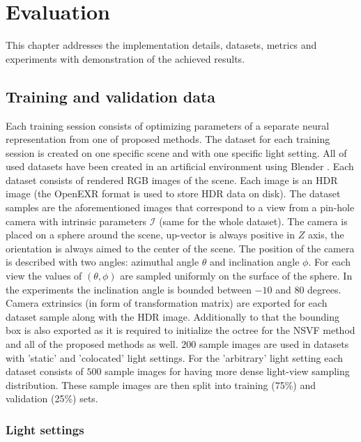 
\chapter{Evaluation}
\label{chap:evaluation}

This chapter addresses the implementation details,
datasets, metrics and experiments with demonstration of the achieved results.



\section{Training and validation data}
\label{sec:datasets}

Each training session consists of optimizing parameters of a separate neural representation from one of proposed methods.
The dataset for each training session is created on one specific scene and with one specific light setting.
All of used datasets have been created in an artificial environment using Blender \cite{blender}.
Each dataset consists of rendered RGB images of the scene.
Each image is an HDR image (the OpenEXR \cite{openexr} format is used to store HDR data on disk).
The dataset samples are the aforementioned images
that correspond to a view from a pin-hole camera with intrinsic parameters $\mathcal{I}$ (same for the whole dataset).
The camera is placed on a sphere around the scene,
up-vector is always positive in $Z$ axis,
the orientation is always aimed to the center of the scene.
The position of the camera is described with two angles: azimuthal angle $\theta$ and inclination angle $\phi$.
For each view the values of $(\theta, \phi)$ are sampled uniformly on the surface of the sphere.
In the experiments the inclination angle is bounded between $-10$ and $80$ degrees.
Camera extrinsics (in form of transformation matrix) are exported for each dataset sample along with the HDR image.
Additionally to that the bounding box is also exported as it is required
to initialize the octree for the NSVF method and all of the proposed methods as well.
$200$ sample images are used in datasets with 'static' and 'colocated' light settings.
For the 'arbitrary' light setting each dataset consists of $500$ sample images
for having more dense light-view sampling distribution.
These sample images are then split into training (75\%) and validation (25\%) sets.


\subsection{Light settings}

